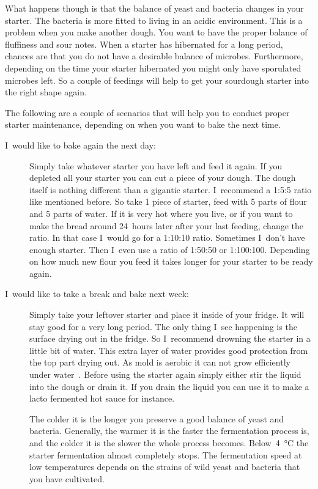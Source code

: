 What happens though is that the balance of yeast and
bacteria changes in your starter. The bacteria is more fitted to living
in an acidic environment. This is a problem when you make another dough.
You want to have the proper balance of fluffiness and sour notes.
When a starter has hibernated for a long period, chances are that
you do not have a desirable balance of microbes.
Furthermore, depending on the time your starter hibernated you might only have
sporulated microbes left. So a couple of feedings will help to get your
sourdough starter into the right shape again.

The following are a couple of scenarios that will help you to conduct proper
starter maintenance, depending on when you want to bake the next time.

\begin{description}
\item[I~would like to bake again the next day:]
Simply take whatever starter you have left and feed it again. If you depleted
all your starter you can cut a piece of your dough. The dough itself is
nothing different than a gigantic starter. I~recommend a 1:5:5 ratio like
mentioned before. So take 1 piece of starter, feed with 5 parts of flour and 5
parts of water. If it is very hot where you live, or if you want to make the
bread around 24~hours later after your last feeding, change the ratio. In that
case I~would go for a 1:10:10 ratio. Sometimes I~don't have enough starter.
Then I~even use a ratio of 1:50:50 or 1:100:100. Depending on how much new
flour you feed it takes longer for your starter to be ready again.

\item[I~would like to take a break and bake next week:]
Simply take your leftover starter and place it inside of your fridge. It will stay good
for a very long period. The only thing I~see happening is the surface
drying out in the fridge. So I~recommend drowning the starter in a little bit
of water. This extra layer of water provides good protection from the top
part drying out. As mold is aerobic it can not grow efficiently under
water~\cite{mold+anaerobic}. Before using the starter again simply either stir
the liquid into the dough or drain it. If you drain the liquid you can use it
to make a lacto fermented hot sauce for instance.

The colder it is the longer you preserve a good balance of yeast and
bacteria. Generally, the warmer it is the faster the fermentation process is,
and the colder it is the slower the whole process becomes.
Below~\qty{4}{\degreeCelsius} the starter fermentation almost completely stops. The
fermentation speed at low temperatures depends on the
strains of wild yeast and bacteria
that you have cultivated.


\end{description}
